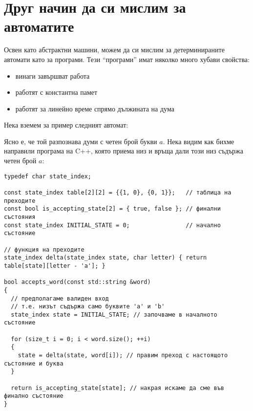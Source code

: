 \section{Друг начин да си мислим за автоматите}

Освен като абстрактни машини, можем да си мислим за детерминираните автомати като за програми.
Тези ``програми'' имат няколко много хубави свойства:
\begin{itemize}
    \item винаги завършват работа
    \item работят с константна памет
    \item работят за линейно време спрямо дължината на дума
\end{itemize}

Нека вземем за пример следният автомат:

\begin{center}
\end{center}

Ясно е, че той разпознава думи с четен брой букви $a$.
Нека видим как бихме направили програма на C++, която приема низ и връща дали този низ съдържа четен брой $a$:

\begin{verbatim}
typedef char state_index;

const state_index table[2][2] = {{1, 0}, {0, 1}};   // таблица на преходите
const bool is_accepting_state[2] = { true, false }; // финални състояния
const state_index INITIAL_STATE = 0;                // начално състояние

// функция на преходите
state_index delta(state_index state, char letter) { return table[state][letter - 'a']; }

bool accepts_word(const std::string &word)
{
  // предполагаме валиден вход
  // т.е. низът съдържа само буквите 'a' и 'b'
  state_index state = INITIAL_STATE; // започваме в началното състояние

  for (size_t i = 0; i < word.size(); ++i)
  {
    state = delta(state, word[i]); // правим преход с настоящото състояние и буква
  }

  return is_accepting_state[state]; // накрая искаме да сме във финално състояние
}
\end{verbatim}

